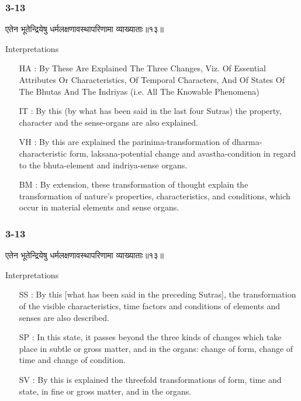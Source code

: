 \begin{frame}[fragile]\frametitle{3-13}
\begin{sanskrit}
एतेन भूतेन्द्रियेषु धर्मलक्षणावस्थापरिणामा व्याख्याताः॥१३॥
\end{sanskrit}

Interpretations
\begin{itemize}	
\item [HA]: By These Are Explained The Three Changes, Viz. Of Essential Attributes Or Characteristics, Of Temporal Characters, And Of States Of The Bhutas And The Indriyas (i.e. All The Knowable Phenomena)
\item [IT]: By this (by what has been said in the last four Sutras) the property, character and the sense-organs are also explained.
\item [VH]: By this are explained the parinima-transformation of dharma-characteristic form, laksana-potential change and avastha-condition in regard to the bhuta-element and indriya-sense organs.
\item [BM]: By extension, these transformation of thought explain the transformation of nature’s properties, characteristics, and conditions, which occur in material elements and sense organs.
\end{itemize}
\end{frame}

\begin{frame}[fragile]\frametitle{3-13}
\begin{sanskrit}
एतेन भूतेन्द्रियेषु धर्मलक्षणावस्थापरिणामा व्याख्याताः॥१३॥
\end{sanskrit}

Interpretations
\begin{itemize}	
\item [SS]: By this [what has been said in the preceding Sutras], the transformation of the visible characteristics, time factors and conditions of elements and senses are also described.
\item [SP]: In this state, it passes beyond the three kinds of changes which take place in subtle or gross matter, and in the organs: change of form, change of time and change of condition.
\item [SV]: By this is explained the threefold transformations of form, time and state, in fine or gross matter, and in the organs. 
\end{itemize}
\end{frame}


